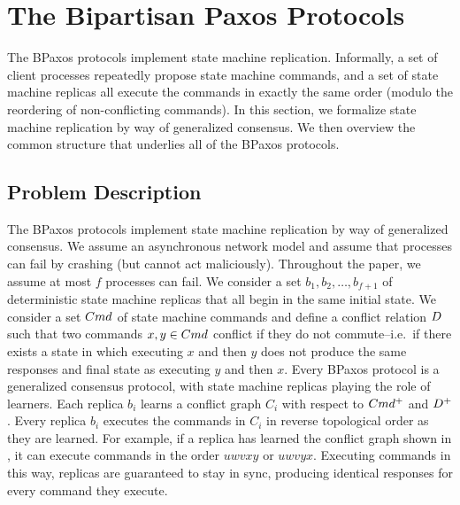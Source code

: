 \section{The Bipartisan Paxos Protocols}
The BPaxos protocols implement state machine replication. Informally, a set of
client processes repeatedly propose state machine commands, and a set of state
machine replicas all execute the commands in exactly the same order (modulo the
reordering of non-conflicting commands). In this section, we formalize state
machine replication by way of generalized consensus. We then overview the
common structure that underlies all of the BPaxos protocols.

\subsection{Problem Description}
The BPaxos protocols implement state machine replication by way of generalized
consensus. We assume an asynchronous network model and assume that processes
can fail by crashing (but cannot act maliciously). Throughout the paper, we
assume at most $f$ processes can fail.  We consider a set $b_1, b_2, \ldots,
b_{f+1}$ of deterministic state machine replicas that all begin in the same
initial state. We consider a set $Cmd$ of state machine commands and define a
conflict relation $D$ such that two commands $x, y \in Cmd$ conflict
if they do not commute--i.e.\ if there exists a state in which executing $x$
and then $y$ does not produce the same responses and final state as executing
$y$ and then $x$.
%
Every BPaxos protocol is a generalized consensus protocol, with state machine
replicas playing the role of learners. Each replica $b_i$ learns a conflict
graph $C_i$ with respect to $Cmd^+$ and $D^+$. Every replica $b_i$
executes the commands in $C_i$ in reverse topological order as they are
learned. For example, if a replica has learned the conflict graph shown in
, it can execute commands in the order $uwvxy$ or $uwvyx$.
Executing commands in this way, replicas are guaranteed to stay in sync,
producing identical responses for every command they execute.

